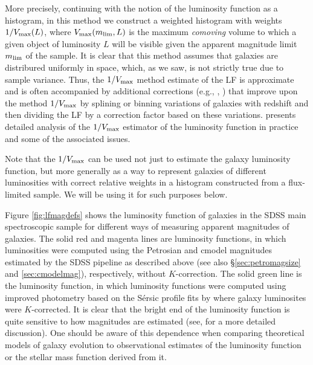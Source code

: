 More precisely, continuing with the notion of the luminosity function as a histogram, in this method we construct a weighted histogram with weights $1/V_{\rm max}(L)$, where $V_{\rm max}(m_{\rm lim},L)$ is the maximum {\it comoving\/} volume to which a given object of luminosity $L$ will be visible given the apparent magnitude limit $m_{\rm lim}$ of the sample. It is clear that this method assumes that galaxies are distribured uniformly in space, which, as we saw, is not strictly true due to sample variance. Thus, the $1/V_{\rm max}$ method estimate of the LF is approximate and is often accompanied by additional corrections (e.g., \href{http://adsabs.harvard.edu/abs/2012MNRAS.421..621B}{\citealt{baldry_etal12}}, \href{http://adsabs.harvard.edu/abs/2015ApJ...803...34B}{\citealt{bouwens_etal15}}) that
 improve upon the method $1/V_{\rm max}$ by splining or binning variations of galaxies with redshift and then dividing the LF by a correction factor based on these variations. \href{http://adsabs.harvard.edu/abs/1977AJ.....82..861F}{\citet{felten77}} presents detailed analysis of the $1/V_{\rm max}$ estimator of the luminosity function in practice and some of the associated issues. 
 
Note that the $1/V_{\rm max}$ can be used not just to estimate the galaxy luminosity function, but more generally as a way to represent galaxies of different luminosities with correct relative weights in a histogram constructed from a flux-limited sample. We will be using it for such purposes below. 

Figure \ref{fig:lfmagdefs} shows the luminosity function of galaxies in the SDSS main spectroscopic sample for different ways of measuring apparent magnitudes of galaxies. 
The solid red and magenta lines are luminosity functions, in which luminosities were computed using the Petrosian and cmodel magnitudes estimated by the SDSS pipeline as described above (see also \S \ref{sec:petromagsize} and \ref{sec:cmodelmag}), respectively, without $K$-correction. The solid green line is the luminosity function, in which luminosity functions were computed using improved photometry based on the S\'ersic profile fits by \protect\href{http://adsabs.harvard.edu/abs/2015MNRAS.446.3943M}{\citet{meert_etal15}} where galaxy luminosites were $K$-corrected. 
It is clear that the bright end of the luminosity function is quite sensitive to how magnitudes are estimated (see, \href{http://adsabs.harvard.edu/abs/2013MNRAS.436..697B}{\citealt{bernardi_etal13}} for a more detailed discussion). One should be aware of this dependence when comparing theoretical models of galaxy evolution to observational estimates of the luminosity function or the stellar mass function derived from it.

